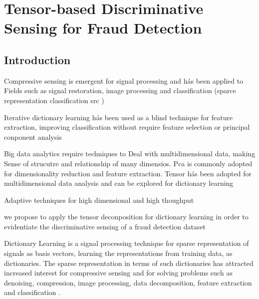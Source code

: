 \chapter{Tensor-based Discriminative Sensing for Fraud Detection}
\label{ch:tensor_dl}

\section{Introduction}
\label{sec:introduction}

Compressive sensing is emergent for signal processing and hás been applied to Fields such as signal restoration, image processing and classification (sparce representation classification src )

Iterative dictionary learning hás been used as a blind technique for feature extraction, improving classification without require feature selection or principal conponent analysis

Big data analytics require techniques to Deal with multidimensional data, making Sense of strucutre and relationship of many dimensios. Pca is commonly adopted for dimensionality reduction and feature extraction. Tensor hás been adopted for multidimensional data analysis and can be explored for dictionary learning

Adaptive techniques for high dimensional and high thoughput

we propose to apply the tensor deconposition for dictionary learning in order to evidentiate the discriminative sensing of a fraud detection dataset

Dictionary Learning is a signal processing technique for sparse representation of signals as basis vectors, learning the representations from training data, as dictionaries. The sparse representation in terms of such dictionaries has attracted increased interest for compressive sensing and for solving problems such as denoising, compression, image processing, data decomposition, feature extraction and classification \cite{tosic2011dictionary, zhang2010discriminative, zhu2016coupled,ravishankar2011mr}.

